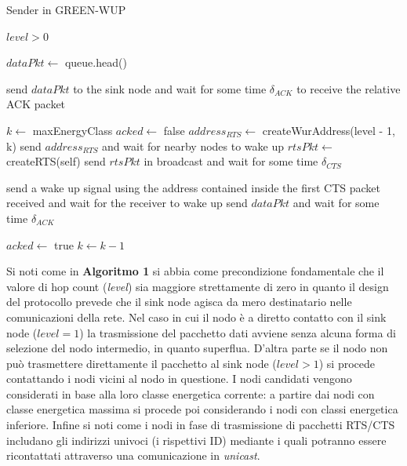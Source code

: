 \documentclass[binding=0.6cm,TFA]{sapthesis}
\begin{document}
\begin{algorithm}
    \caption{Sender in GREEN-WUP}
    \begin{algorithmic}
        \REQUIRE $level > 0$

            \STATE $dataPkt \leftarrow$ queue.head()

                \STATE send $dataPkt$ to the sink node and wait for some time $\delta_{ACK}$ to receive the relative ACK packet

            \ELSE
                \STATE $k \leftarrow$ maxEnergyClass
                \STATE $acked \leftarrow$ false
                    \STATE $address_{RTS} \leftarrow$ createWurAddress(level - 1, k)
                    \STATE send $address_{RTS}$ and wait for nearby nodes to wake up
                    \STATE $rtsPkt \leftarrow$ createRTS(self)
                    \STATE send $rtsPkt$ in broadcast and wait for some time $\delta_{CTS}$
                    
                        \STATE send a wake up signal using the address contained inside the first CTS packet received and wait for the receiver to wake up
                        \STATE send $dataPkt$ and wait for some time $\delta_{ACK}$

                            \STATE $acked \leftarrow$ true
                        \ENDIF
                    \ENDIF
                    \STATE $k \leftarrow k-1$
                \ENDWHILE
            \ENDIF
        
        \ENDWHILE
    \end{algorithmic}
\end{algorithm}

Si noti come in \textbf{Algoritmo 1} si abbia come precondizione fondamentale che il valore di hop count (\emph{level}) sia maggiore strettamente
di zero in quanto il design del protocollo prevede che il sink node agisca da mero destinatario nelle comunicazioni della rete. Nel caso in cui
il nodo è a diretto contatto con il sink node ($level=1$) la trasmissione del pacchetto dati avviene senza alcuna forma di
selezione del nodo intermedio, in quanto superflua. D'altra parte se il nodo non può trasmettere direttamente il pacchetto al sink node ($level>1$)
si procede contattando i nodi vicini al nodo in questione. I nodi candidati vengono considerati in base alla loro classe energetica corrente:
a partire dai nodi con classe energetica massima si procede poi considerando i nodi con classi energetica inferiore. Infine si noti come i nodi in fase
di trasmissione di pacchetti RTS/CTS includano gli indirizzi univoci (i rispettivi ID) mediante i quali potranno essere ricontattati attraverso una
comunicazione in \emph{unicast}.
\end{document}
